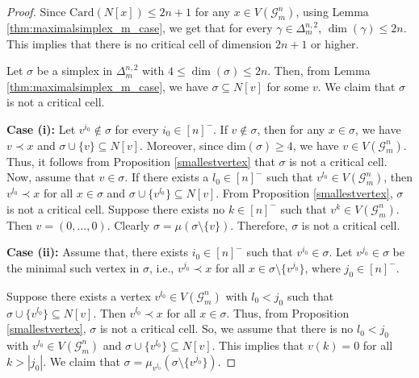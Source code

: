 \documentclass{amsart}
\theoremstyle{definition}
\theoremstyle{remark}
\numberwithin{equation}{section}
\newcommand{\D}{\Delta}
\newcommand{\G}{\mathcal{G}}
\newcommand{\samir}[1]{\textcolor{cyan!65!black}{#1}}
\begin{document}
\begin{proof}
	Since  $\mathrm{Card}(N[x]) \leq 2n+1$ for any $x \in V(\mathcal{G}_m^n)$, using  Lemma \ref{thm:maximalsimplex_m_case}, we get that for every $\gamma \in \D_m^{n,2}$, $\dim(\gamma) \leq 2n$. This implies that there is no critical cell of dimension $2n+1$ or higher.
	
	Let $\sigma$ be a simplex in $\D_m^{n,2}$ with $4 \leq \dim(\sigma) \leq 2n$. Then, from Lemma \ref{thm:maximalsimplex_m_case}, we have  $\sigma \subseteq N[v]$ for some $v$. We claim that $\sigma$ is not a critical cell.
	
	\smallskip
	\noindent\textbf{Case (i):} Let $v^{i_0}\notin \sigma$ for every $i_0\in[n]^{-}$. If $v\notin\sigma$, then for any $x\in \sigma$, we have $v\prec x$ and $\sigma\cup \{v\}\subseteq N[v]$. Moreover, since dim$(\sigma) \geq 4$, we have $v \in V(\G_m^n)$. Thus, it follows from Proposition \ref{smallestvertex} that $\sigma$ is not a critical cell. 
	Now, assume that $v\in \sigma$. If there exists a $l_0 \in [n]^{-}$ such that $v^{l_0} \in V(\mathcal{G}_m^n)$, then $v^{l_0}\prec x$ for all $x\in \sigma$ and $\sigma\cup \{v^{l_0}\} \subseteq N[v]$. From Proposition \ref{smallestvertex}, $\sigma$ is not a critical cell. 
	Suppose there exists no $k \in [n]^{-}$ such that $v^{k} \in V(\mathcal{G}_m^n)$.  Then $v = (0, \ldots, 0)$. Clearly $\sigma = \mu(\sigma\setminus \{v\})$. Therefore, $\sigma$ is not a critical cell.
	
	
	
	\smallskip
	
	\noindent\textbf{Case (ii):} Assume that, there exists $i_0\in[n]^{-}$ such that $v^{i_0}\in\sigma$. Let $v^{j_0} \in \sigma$ be the minimal such vertex in $\sigma$, i.e., $v^{j_0} \prec x$ for all $x \in \sigma \setminus \{v^{j_0}\}$, where $j_0 \in [n]^-$.
	
	
	Suppose there exists a vertex $v^{l_0} \in V(\mathcal{G}_m^n)$ with $l_0 < j_0$ such that $\sigma \cup \{v^{l_0}\} \subseteq N[v]$. Then $v^{l_0} \prec x$ for all $x \in \sigma$. Thus, from Proposition \ref{smallestvertex}, $\sigma$ is not a critical cell. So, we assume that there is no $l_0 < j_0$ with $v^{l_0} \in V(\mathcal{G}_m^n)$ and $\sigma \cup \{v^{l_0}\} \subseteq N[v]$. This implies that $v(k) = 0$ for all $k > |j_0|$. We claim that $\sigma = \mu_{v^{j_0}}(\sigma \setminus \{v^{j_0}\})$.
	

\end{proof}
\end{document}
